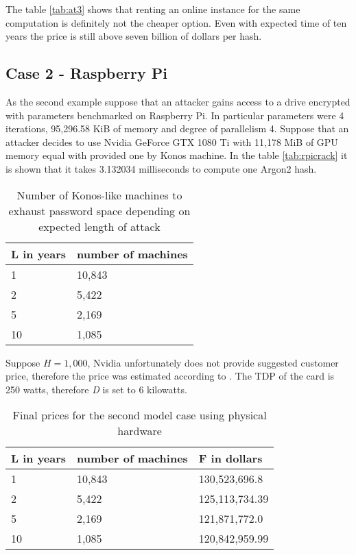 \documentclass[nolof,digital]{fithesis3}
\begin{document}
The table \ref{tab:at3} shows that renting an online instance for the same computation is definitely not the cheaper option. Even with expected time of ten years the price is still above seven billion of dollars per hash.

\FloatBarrier

\subsection{Case 2 - Raspberry Pi}
As the second example suppose that an attacker gains access to a drive encrypted with parameters benchmarked on Raspberry Pi. In particular parameters were 4 iterations, 95,296.58 KiB of memory and degree of parallelism 4. Suppose that an attacker decides to use Nvidia GeForce GTX 1080 Ti with 11,178 MiB of GPU memory equal with provided one by Konos machine. In the table \ref{tab:rpicrack} it is shown that it takes 3.132034 milliseconds to compute one Argon2 hash.

\noindent
\begin{table}
\caption{Number of Konos-like machines to exhaust password space depending on expected length of attack}
\label{tab:at4}
\begin{tabularx}{\textwidth}{| X | X |}
\hline
L in years & number of machines\\
\hline
1 & 10,843\\	
\hline
2 & 5,422\\
\hline
5 & 2,169\\
\hline
10 & 1,085\\
\hline
\end{tabularx}
\end{table}

Suppose $H = 1,000$, Nvidia unfortunately does not provide suggested customer price, therefore the price was estimated according to \parencite{geforceprice}. The TDP of the card is 250 watts, therefore \emph{D} is set to 6 kilowatts.

\noindent
\begin{table}
\caption{Final prices for the second model case using physical hardware}
\label{tab:at5}
\begin{tabularx}{\textwidth}{| X | X | X |}
\hline
L  in years & number of machines & F in dollars\\
\hline
1 & 10,843 & 130,523,696.8\\
\hline
2 & 5,422 & 125,113,734.39\\
\hline
5 & 2,169 & 121,871,772.0\\
\hline
10 & 1,085 & 120,842,959.99\\
\hline
\end{tabularx}
\end{table}
\end{document}
